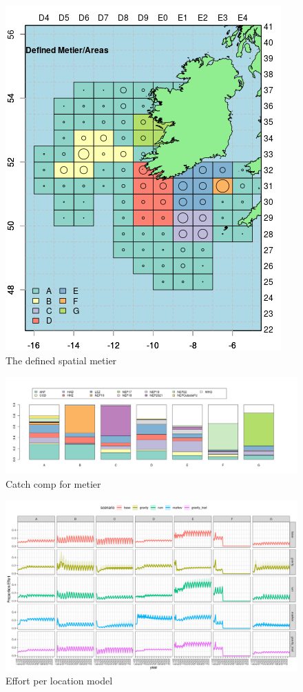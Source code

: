 \documentclass[12pt, halfline, a4paper]{ouparticle}
\begin{document}
\begin{figure}[!ht]
	\centering
	\includegraphics[width=0.8\linewidth]{figures/Final_Metier_locations}
	\caption{The defined spatial metier} 
	\label{fig:metier}
\end{figure}	

\begin{figure}[!ht]
	\centering
	\includegraphics[width=0.8\linewidth]{figures/Final_Metier_catchcomp}
	\caption{Catch comp for metier} 
	\label{fig:catchcomp}
\end{figure}	

\newpage

\begin{figure}
	\centering
	\includegraphics[width=1\linewidth]{figures/Effort_shares}
	\caption{Effort per location model} 
	\label{fig:effort}
\end{figure}	
\end{document}
